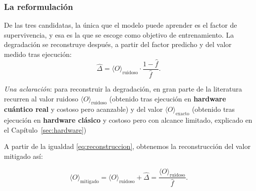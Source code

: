 \subsubsection{La reformulación}
\label{sec:reformulacion}

De las tres candidatas, la única que el modelo puede aprender es el factor de supervivencia, y
esa es la que se escoge como objetivo de entrenamiento. La degradación se
reconstruye después, a partir del factor predicho y del valor medido tras ejecución:
\begin{equation}
\label{eq:reconstruccion}
\hat\Delta = \langle O \rangle_{\text{ruidoso}}\cdot\frac{1 - \hat f}{\hat f} .
\end{equation}


\textit{Una aclaración}: para reconstruir la degradación, en gran parte de la literatura  recurren al valor ruidoso $\langle O \rangle_{\text{ruidoso}}$ (obtenido tras ejecución en \textbf{hardware cuántico real} y costoso pero acanzable) y del valor $\langle O \rangle_{\text{exacto}}$ (obtenido tras ejecución en \textbf{hardware clásico} y costoso pero con alcance limitado, explicado en el Capítulo~\ref{sec:hardware})



\begin{center} 
\end{center}


A partir de la igualdad \ref{eq:reconstruccion}, obtenemos la reconstrucción del valor mitigado así:

\begin{equation}
\label{eq:mitigado}
\langle O \rangle_{\text{mitigado}}
  = \langle O \rangle_{\text{ruidoso}} + \hat\Delta
  = \frac{\langle O \rangle_{\text{ruidoso}}}{\hat f} .
\end{equation}

